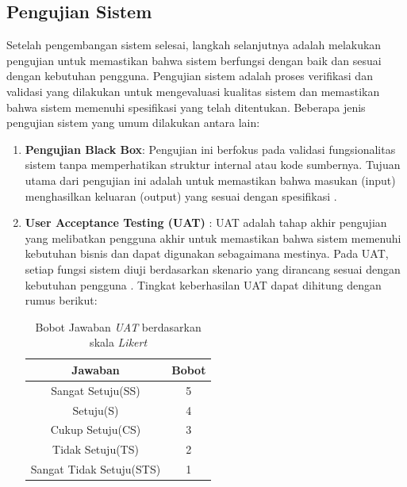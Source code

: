 \subsection{Pengujian Sistem}

Setelah pengembangan sistem selesai, langkah selanjutnya adalah melakukan pengujian untuk memastikan bahwa sistem berfungsi dengan baik dan sesuai dengan kebutuhan pengguna. Pengujian sistem adalah proses verifikasi dan validasi yang dilakukan untuk mengevaluasi kualitas sistem dan memastikan bahwa sistem memenuhi spesifikasi yang telah ditentukan. Beberapa jenis pengujian sistem yang umum dilakukan antara lain:

\begin{enumerate}
    \item  \textbf{Pengujian Black Box}: Pengujian ini berfokus pada validasi fungsionalitas sistem tanpa memperhatikan struktur internal atau kode sumbernya. Tujuan utama dari pengujian ini adalah untuk memastikan bahwa masukan (input) menghasilkan keluaran (output) yang sesuai dengan spesifikasi \cite{pressman2014}.


    \item \textbf{User Acceptance Testing (UAT)} : UAT adalah tahap akhir pengujian yang melibatkan pengguna akhir untuk memastikan bahwa sistem memenuhi kebutuhan bisnis dan dapat digunakan sebagaimana mestinya. Pada UAT, setiap fungsi sistem diuji berdasarkan skenario yang dirancang sesuai dengan kebutuhan pengguna \cite{mathur2017}. Tingkat keberhasilan UAT dapat dihitung dengan rumus berikut:

          \begin{table}[H]
              \centering
              \begin{tabular}{|c|c|}
                  \hline
                  \textbf{Jawaban}         & \textbf{Bobot} \\ \hline
                  Sangat Setuju(SS)        & 5              \\ \hline
                  Setuju(S)                & 4              \\ \hline
                  Cukup Setuju(CS)         & 3              \\ \hline
                  Tidak Setuju(TS)         & 2              \\ \hline
                  Sangat Tidak Setuju(STS) & 1              \\ \hline
              \end{tabular}
              \caption{Bobot Jawaban \textit{UAT} berdasarkan skala \textit{Likert}}
              \label{tabel:bobot-jawaban-uat}
          \end{table}


\end{enumerate}
